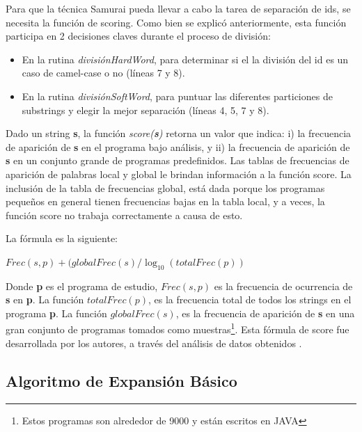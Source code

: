 Para que la técnica Samurai pueda llevar a cabo la tarea de separación de ids, se necesita la función de scoring. Como bien se explicó anteriormente, esta función participa en 2 decisiones claves durante el proceso de división:

\begin{itemize}
\itemsep0em%
\item En la rutina \textit{divisiónHardWord}, para determinar si el la división del id es un caso de camel-case o no (líneas 7 y 8).

\item En la rutina \textit{divisiónSoftWord}, para puntuar las diferentes particiones de substrings y elegir la mejor separación (líneas 4, 5, 7 y 8).
\end{itemize}

Dado un string \textbf{s}, la función \textit{score(\textbf{s})} retorna un valor que indica: i) la frecuencia de aparición de \textbf{s} en el programa bajo análisis, y ii) la frecuencia de aparición de \textbf{s} en un conjunto grande de programas predefinidos. Las tablas de frecuencias de aparición de palabras local y global le brindan información a la función score. La inclusión de la tabla de frecuencias global, está dada porque los programas pequeños en general tienen frecuencias bajas en la tabla local, y a veces, la función score no trabaja correctamente a causa de esto.

La fórmula es la siguiente:

\begin{center}
$Frec(s,p) + ( globalFrec(s) / \log_{10}(totalFrec(p) )$
\end{center}

Donde \textbf{p} es el programa de estudio, $Frec(s,p)$ es la frecuencia de ocurrencia de \textbf{s} en \textbf{p}. La función $totalFrec(p)$, es la frecuencia total de todos los strings en el programa \textbf{p}. La función $globalFrec(s)$, es la frecuencia de aparición de \textbf{s} en una gran conjunto de programas tomados como muestras\footnote[1]{Estos programas son alrededor de 9000 y están escritos en JAVA}. Esta fórmula de score fue desarrollada por los autores, a través del análisis de datos obtenidos \cite{EHPV09}.

\pagebreak
\subsection{Algoritmo de Expansión Básico}
\label{sec:algExpBas}

